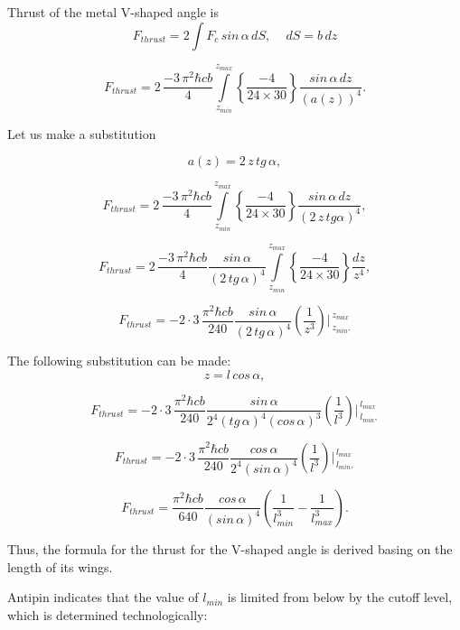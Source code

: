 \documentclass[twoside, 10pt]{article}
\begin{document}
\begin{multicols}{2}
Thrust of the metal \mbox{V-shaped} angle is
\noindent
\begin{equation}F_{thrust} = 2 \int F_{c} \, sin\, \alpha \,dS, \,\,\,\,\,\,\, dS = b\,dz\end{equation}

\noindent
\begin{equation}F_{thrust} = 2\, \frac{-3\,\pi^2\hbar c b}{4}\int\limits_{z_{min}}^{z_{max}} \left\{\frac{-4}{24\times30}\right\}\frac{sin\, \alpha\,dz}{\left(a\left(z\right)\right)^4}.\end{equation}

Let us make a substitution

\[a\left(z\right) = 2\,z\,tg\, \alpha,\]

\[F_{thrust} = 2\, \frac{-3\,\pi^2\hbar c b}{4}\int\limits_{z_{min}}^{z_{max}} \left\{\frac{-4}{24\times30}\right\}\frac{sin\, \alpha\,dz}{\left(2\,z\,tg \alpha\right)^4},\]

\[F_{thrust} = 2\, \frac{-3\,\pi^2\hbar c b}{4} \frac{sin\, \alpha}{\left(2\,tg\, \alpha\right)^4} \int\limits_{z_{min}}^{z_{max}} \left\{\frac{-4}{24\times30}\right\} \frac{dz}{z^4},\]

\[F_{thrust} = -2\cdot3\, \frac{\pi^2\hbar c b}{240} \frac{sin\, \alpha}{\left(2\,tg\, \alpha\right)^4} \left(\frac{1}{z^3}\right)\Bigg\rvert_{\,z_{min}.}^{\,z_{max}} \]

    The following substitution can be made: \[z = l\, cos\, \alpha,\]

\[F_{thrust} = -2\cdot3\, \frac{\pi^2\hbar c b}{240} \frac{sin\, \alpha}{2^4\left(tg\,\alpha\right)^4\left(cos\, \alpha\right)^3} \left(\frac{1}{l^3}\right)\Bigg\rvert_{\,l_{min},}^{\,l_{max}} \]

\[F_{thrust} = -2\cdot3\, \frac{\pi^2\hbar c b}{240} \frac{cos\, \alpha}{2^4\left(sin\, \alpha\right)^4} \left(\frac{1}{l^3}\right)\Bigg\rvert_{\,l_{min},}^{\,l_{max}} \]

\noindent
\begin{equation}F_{thrust} = \frac{\pi^2\hbar c b}{640} \frac{cos\, \alpha}{\left(sin\, \alpha\right)^4} \left(\frac{1}{l_{min}^3} - \frac{1}{l_{max}^3}\right).\end{equation}

Thus, the formula for the thrust for the \mbox{V-shaped} angle is derived basing on the
length of its wings.

Antipin indicates that the value of \(l_{min}\) is limited from below by
the {\glqq}cutoff{\grqq} level, which is determined technologically:


\end{multicols}
\end{document}
